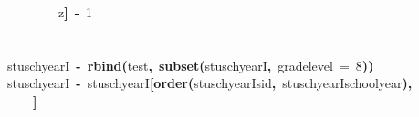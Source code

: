 \documentclass[12pt]{article}
\makeatletter
\newcommand{\hlnumber}[1]{\textcolor[rgb]{0,0,0}{#1}}%
\newcommand{\hlfunctioncall}[1]{\textcolor[rgb]{0.501960784313725,0,0.329411764705882}{\textbf{#1}}}%
\newcommand{\hlkeyword}[1]{\textcolor[rgb]{0,0,0}{\textbf{#1}}}%
\newcommand{\hlassignement}[1]{\textcolor[rgb]{0,0,0}{\textbf{#1}}}%
\newcommand{\hlsymbol}[1]{\textcolor[rgb]{0,0,0}{#1}}%
\newcommand{\hlstd}[1]{\textcolor[rgb]{0,0,0}{#1}}%
\newenvironment{kframe}{%
 \def\FrameCommand##1{\hskip\@totalleftmargin \hskip-\fboxsep
 \colorbox{shadecolor}{##1}\hskip-\fboxsep
     \hskip-\linewidth \hskip-\@totalleftmargin \hskip\columnwidth}%
 \MakeFramed {\advance\hsize-\width
   \@totalleftmargin\z@ \linewidth\hsize
   \@setminipage}}%
 {\par\unskip\endMakeFramed}
\newenvironment{knitrout}{}{} %
\renewenvironment{knitrout}{\begin{footnotesize}}{\end{footnotesize}}
\makeatother
\begin{document}
\begin{knitrout}
\begin{kframe}
\begin{flushleft}
\hlstd{}{\ }{\ }{\ }{\ }{\ }{\ }{\ }{\ }\hlsymbol{z}\hlkeyword{]}{\ }\hlassignement{\usebox{\hlnormalsizeboxlessthan}-}{\ }\hlnumber{1}\hspace*{\fill}\\
\hlstd{}\hlkeyword{\usebox{\hlnormalsizeboxclosebrace}}\hspace*{\fill}\\
\hlstd{}\hspace*{\fill}\\
\hlstd{}\hlsymbol{stuschyearI}{\ }\hlassignement{\usebox{\hlnormalsizeboxlessthan}-}{\ }\hlfunctioncall{rbind}\hlkeyword{(}\hlsymbol{test}\hlkeyword{,}{\ }\hlfunctioncall{subset}\hlkeyword{(}\hlsymbol{stuschyearI}\hlkeyword{,}{\ }\hlsymbol{grade\usebox{\hlnormalsizeboxunderscore}level}{\ }\usebox{\hlnormalsizeboxlessthan}={\ }\hlnumber{8}\hlkeyword{)}\hlkeyword{)}\hspace*{\fill}\\
\hlstd{}\hlsymbol{stuschyearI}{\ }\hlassignement{\usebox{\hlnormalsizeboxlessthan}-}{\ }\hlsymbol{stuschyearI}\hlkeyword{[}\hlfunctioncall{order}\hlkeyword{(}\hlsymbol{stuschyearI}\hlkeyword{\usebox{\hlnormalsizeboxdollar}}\hlsymbol{sid}\hlkeyword{,}{\ }\hlsymbol{stuschyearI}\hlkeyword{\usebox{\hlnormalsizeboxdollar}}\hlsymbol{school\usebox{\hlnormalsizeboxunderscore}year}\hlkeyword{)}\hlkeyword{,}\hspace*{\fill}\\
\hlstd{}{\ }{\ }{\ }{\ }\hlkeyword{]}\mbox{}
\normalfont
\end{flushleft}
\end{kframe}
\end{knitrout}
\end{document}
